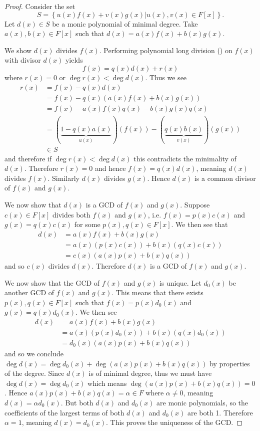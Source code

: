 \begin{proof}
    Consider the set
    \[
        S = \left\{u(x)f(x) + v(x)g(x) \vert u(x), v(x) \in F[x]\right\}.
    \]
    Let $d(x) \in S$ be a monic polynomial of minimal degree. Take $a(x),b(x) \in F[x]$ such that $d(x) = a(x)f(x) + b(x)g(x)$.

    We show $d(x)$ divides $f(x)$. Performing polynomial long division () on $f(x)$ with divisor $d(x)$ yields
    \[
        f(x) = q(x)d(x) + r(x)
    \]
    where $r(x) = 0$ or $\deg r(x) < \deg d(x)$. Thus we see
    \begin{align*}
        r(x) &= f(x) - q(x)d(x)\\
        &= f(x)-q(x)\left(a(x)f(x) + b(x)g(x)\right)\\
        &= f(x) - a(x)f(x)q(x) - b(x)g(x)q(x)\\
        &= (\underbrace{1 - q(x)a(x)}_{u(x)})(f(x)) - (\underbrace{q(x)b(x)}_{v(x)})(g(x))\\
        &\in S
    \end{align*}
    and therefore if $\deg r(x) < \deg d(x)$ this contradicts the minimality of $d(x)$. Therefore $r(x) = 0$ and hence $f(x) = q(x)d(x)$, meaning $d(x)$ divides $f(x)$. Similarly $d(x)$ divides $g(x)$. Hence $d(x)$ is a common divisor of $f(x)$ and $g(x)$.

    We now show that $d(x)$ is a GCD of $f(x)$ and $g(x)$. Suppose $c(x) \in F[x]$ divides both $f(x)$ and $g(x)$, i.e. $f(x) = p(x)c(x)$ and $g(x) = q(x)c(x)$ for some $p(x), q(x) \in F[x]$. We then see that
    \begin{align*}
        d(x) &= a(x)f(x) + b(x)g(x)\\
        &= a(x)(p(x)c(x)) + b(x)(q(x)c(x))\\
        &= c(x)(a(x)p(x) + b(x)q(x))
    \end{align*}
    and so $c(x)$ divides $d(x)$. Therefore $d(x)$ is a GCD of $f(x)$ and $g(x)$.

    We now show that the GCD of $f(x)$ and $g(x)$ is unique. Let $d_0(x)$ be another GCD of $f(x)$ and $g(x)$. This means that there exists $p(x), q(x) \in F[x]$ such that $f(x) = p(x)d_0(x)$ and $g(x) = q(x)d_0(x)$. We then see
    \begin{align*}
        d(x) &= a(x)f(x) + b(x)g(x)\\
        &= a(x)(p(x)d_0(x)) + b(x)(q(x)d_0(x))\\
        &= d_0(x)(a(x)p(x) + b(x)q(x))
    \end{align*}
    and so we conclude $\deg d(x) = \deg d_0(x) + \deg\left(a(x)p(x) + b(x)q(x)\right)$ by properties of the degree. Since $d(x)$ is of minimal degree, thus we must have $\deg d(x) = \deg d_0(x)$ which means $\deg\left(a(x)p(x) + b(x)q(x)\right) = 0$. Hence $a(x)p(x) + b(x)q(x) = \alpha \in F$ where $\alpha \neq 0$, meaning $d(x) = \alpha d_0(x)$. But both $d(x)$ and $d_0(x)$ are monic polynomials, so the coefficients of the largest terms of both $d(x)$ and $d_0(x)$ are both 1. Therefore $\alpha = 1$, meaning $d(x) = d_0(x)$. This proves the uniqueness of the GCD.
\end{proof}

